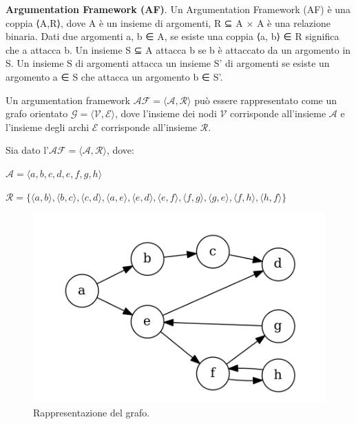 \bigskip
\begin{defn} \textbf{Argumentation Framework (AF)}. Un Argumentation Framework (AF) è una coppia ⟨A,R⟩, dove A è un insieme di argomenti, R ⊆ A × A è una relazione binaria. Dati due argomenti a, b ∈ A, se esiste una coppia ⟨a, b⟩ ∈ R significa che a attacca b. Un insieme S ⊆ A attacca b se b è attaccato da un argomento in S. Un insieme S di argomenti attacca un insieme S' di argomenti se esiste un argomento a ∈ S che attacca un argomento b ∈ S'.
\end{defn}

Un argumentation framework $\mathcal{AF = ⟨A,R⟩}$ può essere rappresentato come un grafo orientato $\mathcal{G = ⟨V, E⟩}$, dove l’insieme dei nodi $\mathcal{V}$ corrisponde all'insieme $\mathcal{A}$ e l’insieme degli archi $\mathcal{E}$ corrisponde all'insieme $\mathcal{R}$.

\bigskip
\begin{exmp}
    Sia dato l'$\mathcal{AF = ⟨A, R⟩}$, dove:
    \begin{center}
        $\mathcal{A} = ⟨a, b, c, d, e, f, g, h⟩$
        
        $\mathcal{R} = \{⟨a, b⟩, ⟨b, c⟩, ⟨c, d⟩, ⟨a, e⟩, ⟨e, d⟩, ⟨e, f ⟩, ⟨f, g⟩, ⟨g, e⟩, ⟨f, h⟩, ⟨h, f ⟩\}$
    \end{center}
    
    \begin{figure}
      \includegraphics[width=\linewidth]{Immagini/example-graph.png}
      \caption{Rappresentazione del grafo.}
      \label{fig:graph1}
    \end{figure}
    
    \label{exm:af}
\end{exmp}


